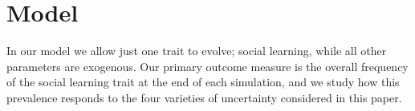 \documentclass[letterpaper,11.5pt]{scrartcl}
\newcommand{\cm}[1]{{\textcolor{mypurple} {({\tiny CM:} #1)}}}
\newcommand{\ps}[1]{{\textcolor{mygreen} {({\tiny PS:} #1)}}}
\begin{document}


\section{Model}


In our model we allow just one trait to evolve; social learning, while all other parameters are exogenous. Our primary outcome measure is the overall frequency of the social learning trait at the end of each simulation, and we study how this prevalence responds to the four varieties of uncertainty considered in this paper. 
\end{document}

